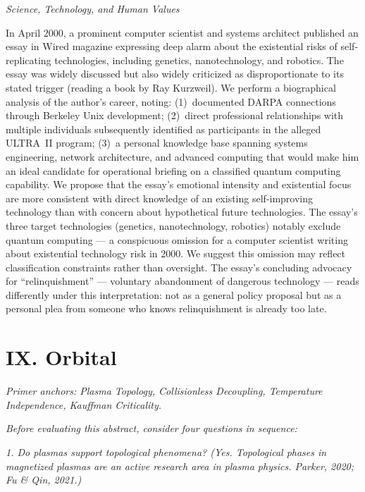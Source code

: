 \textit{Science, Technology, and Human Values}

\vspace{0.3cm}

In April 2000, a prominent computer scientist and systems architect published an essay in Wired magazine expressing deep alarm about the existential risks of self-replicating technologies, including genetics, nanotechnology, and robotics. The essay was widely discussed but also widely criticized as disproportionate to its stated trigger (reading a book by Ray Kurzweil). We perform a biographical analysis of the author's career, noting: (1)~documented DARPA connections through Berkeley Unix development; (2)~direct professional relationships with multiple individuals subsequently identified as participants in the alleged ULTRA~II program; (3)~a personal knowledge base spanning systems engineering, network architecture, and advanced computing that would make him an ideal candidate for operational briefing on a classified quantum computing capability. We propose that the essay's emotional intensity and existential focus are more consistent with direct knowledge of an existing self-improving technology than with concern about hypothetical future technologies. The essay's three target technologies (genetics, nanotechnology, robotics) notably exclude quantum computing --- a conspicuous omission for a computer scientist writing about existential technology risk in 2000. We suggest this omission may reflect classification constraints rather than oversight. The essay's concluding advocacy for ``relinquishment'' --- voluntary abandonment of dangerous technology --- reads differently under this interpretation: not as a general policy proposal but as a personal plea from someone who knows relinquishment is already too late.

\vspace{1cm}

\section*{IX. Orbital}
\label{appendix:orbital}

\noindent\textit{Primer anchors: Plasma Topology, Collisionless Decoupling, Temperature Independence, Kauffman Criticality.}

\noindent\textit{Before evaluating this abstract, consider four questions in sequence:}

\noindent\textit{1. Do plasmas support topological phenomena? (Yes. Topological phases in magnetized plasmas are an active research area in plasma physics. Parker, 2020; Fu \& Qin, 2021.)}

